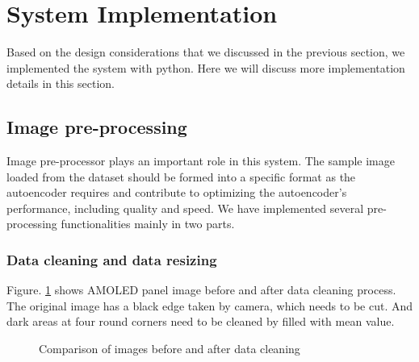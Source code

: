 \documentclass[runningheads]{llncs}
\begin{document}
\section{System Implementation}
Based on the design considerations that we discussed in the previous section, we implemented the system with python. Here we will discuss more implementation details in this section.
\subsection{Image pre-processing}
Image pre-processor plays an important role in this system. The sample image loaded from the dataset should be formed into a specific format as the autoencoder requires and contribute to optimizing the autoencoder’s performance, including quality and speed. We have implemented several pre-processing functionalities mainly in two parts.

\subsubsection{Data cleaning and data resizing\\}
Figure. \ref{dataclean} shows AMOLED panel image before and after data cleaning process. The original image has a black edge taken by camera, which needs to be cut. And dark areas at four round corners need to be cleaned by filled with mean value.
\begin{figure}
    \centering
    \caption{Comparison of images before and after data cleaning}
    \label{dataclean}
\end{figure}
\end{document}
